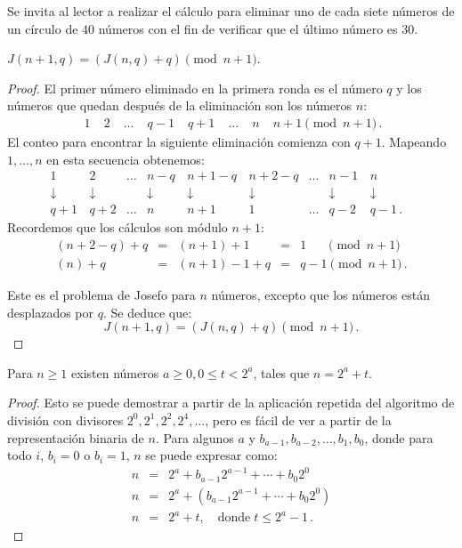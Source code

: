 Se invita al lector a realizar el cálculo para eliminar uno de cada siete números de un círculo de $40$ números con el fin de verificar que el último número es $30$.

\begin{theorem}\label{thm.jo1}
$J(n+1,q)=(J(n,q)+q) \pmod {n+1}$.
\end{theorem}

\begin{proof}
El primer número eliminado en la primera ronda es el número $q$ y los números que quedan después de la eliminación son los números $n$:
\[
\begin{array}{rrrrrrrr}
\;1&\;2&\;\ldots&\;q-1&\;q+1&\;\ldots&\;n&\;n+1 \pmod {n+1}\,.
\end{array}
\]
El conteo para encontrar la siguiente eliminación comienza con $q+1$. Mapeando $1,\ldots,n$ en esta secuencia obtenemos:
\[
\begin{array}{cccccccccc}
1&\, 2&\ldots& n-q&\, n+1-q&\, n+2-q&\ldots&n-1&\, n&\\
\downarrow&\, \downarrow&&\downarrow&\, \downarrow&\, \downarrow&&\downarrow&\, \downarrow\\
q+1&\, q+2&\ldots&n&\, n+1&\, 1&\ldots&q-2&\, q-1\,.
\end{array}
\]
Recordemos que los cálculos son módulo $n+1$:
\[
\begin{array}{lclcl}
(n+2-q)+q&=& (n+1)+1&=& 1 \quad\;\;\pmod {n+1}\\
(n)+q&= &(n+1)-1+q&= &q-1\pmod {n+1}\,.
\end{array}
\]

Este es el problema de Josefo para $n$ números, excepto que los números están desplazados por $q$. Se deduce que:
\[
J(n+1,q)=(J(n,q)+q) \pmod {n+1}\,.
\]
\end{proof}

\begin{theorem}\label{lem.jo}
Para $n\geq 1$ existen números $a\geq 0, 0\leq t < 2^a$, tales que $n=2^a+t$.
\end{theorem}
\begin{proof}
Esto se puede demostrar a partir de la aplicación repetida del algoritmo de división con divisores $2^0, 2^1, 2^2, 2^4,\ldots$, pero es fácil de ver a partir de la representación binaria de $n$. Para algunos $a$ y $b_{a-1},b_{a-2},\ldots,b_{1},b_{0}$, donde para todo $i$, $b_i=0$ o $b_i=1$, $n$ se puede expresar como:
\begin{eqnarray*}
n&=&2^a+b_{a-1}2^{a-1}+\cdots+b_{0}2^{0}\\
n&=&2^a+(b_{a-1}2^{a-1}+\cdots+b_{0}2^{0})\\
n&=&2^a+t,\quad \textrm{donde}\; t\leq 2^a-1\,.
\end{eqnarray*}
\end{proof}

